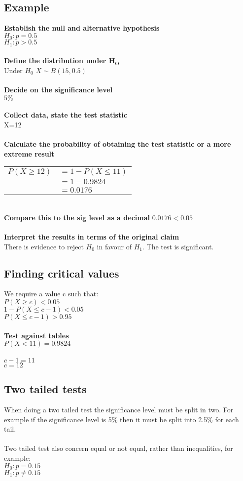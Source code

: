 \documentclass{article}[18pt]
\begin{document}
\subsection{Example}
\textbf{Establish the null and alternative hypothesis}\\
$H_0:p=0.5$\\
$H_1:p>0.5$\\
\\
\textbf{Define the distribution under $\mathbf{H_O}$}\\
Under $H_0$ $X\sim B(15,0.5)$\\
\\
\textbf{Decide on the significance level}\\
$5\%$\\
\\
\textbf{Collect data, state the test statistic}\\
X=12\\
\\
\textbf{Calculate the probability of obtaining the test statistic or a more extreme result}\\
\begin{tabular}{r l}
$P(X\geqslant 12)$&$=1-P(X\leqslant 11)$\\
&$=1-0.9824$\\
&$=0.0176$\\
\end{tabular}
\\
\textbf{Compare this to the sig level as a decimal}
$0.0176<0.05$\\
\\
\textbf{Interpret the results in terms of the original claim}\\
There is evidence to reject $H_0$ in favour of $H_1$. The test is significant.
\subsection{Finding critical values}
We require a value c such that:\\
$P(X\geqslant c)<0.05$\\
$1-P(X\leqslant c-1)<0.05$\\
$P(X\leqslant c-1)>0.95$\\
\\
\textbf{Test against tables}\\
$P(X<11)=0.9824$\\
\\
$c-1=11$\\
$c=12$
\subsection{Two tailed tests}
When doing a two tailed test the significance level must be split in two. For example if the significance level is 5\% then it must be split into 2.5\% for each tail.\\
\\
Two tailed test also concern equal or not equal, rather than inequalities, for example:\\
$H_0 : p=0.15$\\
$H_1 : p\neq0.15$
\end{document}
